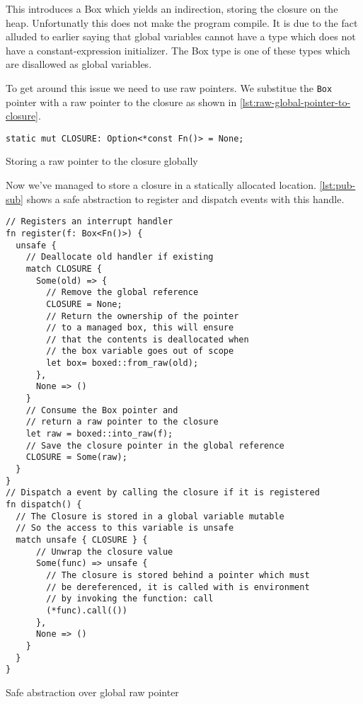 This introduces a Box which yields an indirection, storing the closure on the heap.
Unfortunatly this does not make the program compile.
It is due to the fact alluded to earlier saying that global variables cannot have a type which does not have a constant-expression initializer.
The Box type is one of these types which are disallowed as global variables.

To get around this issue we need to use raw pointers.
We substitue the \texttt{Box} pointer with a raw pointer to the closure as shown in \autoref{lst:raw-global-pointer-to-closure}.

\begin{listing}[H]
  \begin{verbatim}
static mut CLOSURE: Option<*const Fn()> = None;
  \end{verbatim}
  \caption{Storing a raw pointer to the closure globally}
  \label{lst:raw-global-pointer-to-closure}
\end{listing}

Now we've managed to store a closure in a statically allocated location.
\autoref{lst:pub-sub} shows a safe abstraction to register and dispatch events with this handle.

\begin{listing}[H]
  \begin{verbatim}
// Registers an interrupt handler
fn register(f: Box<Fn()>) {
  unsafe {
    // Deallocate old handler if existing
    match CLOSURE {
      Some(old) => {
        // Remove the global reference
        CLOSURE = None;
        // Return the ownership of the pointer
        // to a managed box, this will ensure
        // that the contents is deallocated when
        // the box variable goes out of scope
        let box= boxed::from_raw(old);
      },
      None => ()
    }
    // Consume the Box pointer and
    // return a raw pointer to the closure
    let raw = boxed::into_raw(f);
    // Save the closure pointer in the global reference
    CLOSURE = Some(raw);
  }
}
// Dispatch a event by calling the closure if it is registered
fn dispatch() {
  // The Closure is stored in a global variable mutable
  // So the access to this variable is unsafe
  match unsafe { CLOSURE } {
      // Unwrap the closure value
      Some(func) => unsafe {
        // The closure is stored behind a pointer which must
        // be dereferenced, it is called with is environment
        // by invoking the function: call
        (*func).call(())
      },
      None => ()
    }
  }
}
  \end{verbatim}
  \caption{Safe abstraction over global raw pointer}
  \label{lst:reg-disp}
\end{listing}

